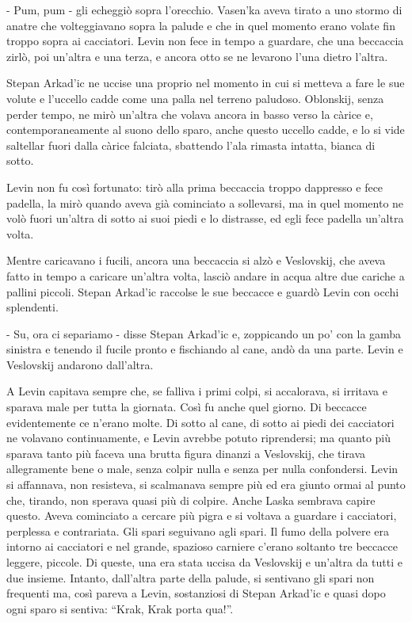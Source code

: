 - Pum, pum - gli echeggiò sopra l'orecchio. Vasen'ka aveva tirato a uno stormo di anatre che volteggiavano sopra la palude e che in quel momento erano volate fin troppo sopra ai cacciatori. Levin non fece in tempo a guardare, che una beccaccia zirlò, poi un'altra e una terza, e ancora otto se ne levarono l'una dietro l'altra. 

Stepan Arkad'ic ne uccise una proprio nel momento in cui si metteva a fare le sue volute e l'uccello cadde come una palla nel terreno paludoso. Oblonskij, senza perder tempo, ne mirò un'altra che volava ancora in basso verso la càrice e, contemporaneamente al suono dello sparo, anche questo uccello cadde, e lo si vide saltellar fuori dalla càrice falciata, sbattendo l'ala rimasta intatta, bianca di sotto. 

Levin non fu così fortunato: tirò alla prima beccaccia troppo dappresso e fece padella, la mirò quando aveva già cominciato a sollevarsi, ma in quel momento ne volò fuori un'altra di sotto ai suoi piedi e lo distrasse, ed egli fece padella un'altra volta. 

Mentre caricavano i fucili, ancora una beccaccia si alzò e Veslovskij, che aveva fatto in tempo a caricare un'altra volta, lasciò andare in acqua altre due cariche a pallini piccoli. Stepan Arkad'ic raccolse le sue beccacce e guardò Levin con occhi splendenti. 

- Su, ora ci separiamo - disse Stepan Arkad'ic e, zoppicando un po' con la gamba sinistra e tenendo il fucile pronto e fischiando al cane, andò da una parte. Levin e Veslovskij andarono dall'altra. 

A Levin capitava sempre che, se falliva i primi colpi, si accalorava, si irritava e sparava male per tutta la giornata. Così fu anche quel giorno. Di beccacce evidentemente ce n'erano molte. Di sotto al cane, di sotto ai piedi dei cacciatori ne volavano continuamente, e Levin avrebbe potuto riprendersi; ma quanto più sparava tanto più faceva una brutta figura dinanzi a Veslovskij, che tirava allegramente bene o male, senza colpir nulla e senza per nulla confondersi. Levin si affannava, non resisteva, si scalmanava sempre più ed era giunto ormai al punto che, tirando, non sperava quasi più di colpire. Anche Laska sembrava capire questo. Aveva cominciato a cercare più pigra e si voltava a guardare i cacciatori, perplessa e contrariata. Gli spari seguivano agli spari. Il fumo della polvere era intorno ai cacciatori e nel grande, spazioso carniere c'erano soltanto tre beccacce leggere, piccole. Di queste, una era stata uccisa da Veslovskij e un'altra da tutti e due insieme. Intanto, dall'altra parte della palude, si sentivano gli spari non frequenti ma, così pareva a Levin, sostanziosi di Stepan Arkad'ic e quasi dopo ogni sparo si sentiva: ``Krak, Krak porta qua!''. 

